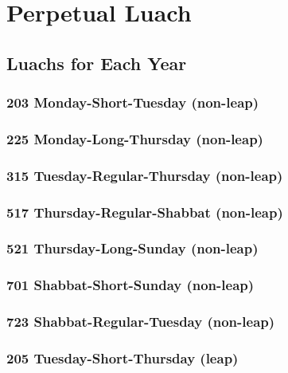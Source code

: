\part{Perpetual Luach}





\chapter{Luachs for Each Year}
\section{203 Monday-Short-Tuesday (non-leap)}
\label{702}
\tishreiMon

\section{225 Monday-Long-Thursday (non-leap)}
\label{225}
\tishreiMon

\section{315 Tuesday-Regular-Thursday (non-leap)}
\label{315}
\tishreiTues

\section{517 Thursday-Regular-Shabbat (non-leap)}
\label{517}
\tishreiThurs

\section{521 Thursday-Long-Sunday (non-leap)}
\label{521}
\tishreiThurs

\section{701 Shabbat-Short-Sunday (non-leap)}
\label{701}
\tishreiShab
{}
\kislevTues

\section{723 Shabbat-Regular-Tuesday (non-leap)}
\label{723}
\tishreiShab
{}

\section{205 Tuesday-Short-Thursday (leap)}
\label{205}
\tishreiTues

